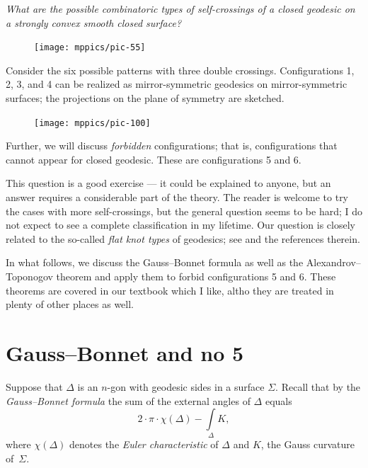 \documentclass[oneside,a4paper]{amsart}
\begin{document}
\medskip

\emph{What are the possible combinatoric types of self-crossings of a closed geodesic on a strongly convex smooth closed surface?}

\begin{figure}[ht!]
\begin{center}
\texttt{[image: mppics/pic-55]}
\end{center}
\end{figure}

Consider the six possible patterns with three double crossings.
Configurations 1, 2, 3, and 4 can be realized as mirror-symmetric geodesics on mirror-symmetric surfaces; the projections on the plane of symmetry are sketched.
\begin{figure}[ht!]
\begin{center}
\texttt{[image: mppics/pic-100]}
\end{center}
\end{figure}

Further, we will discuss \emph{forbidden} configurations;
that is, configurations that cannot appear for closed geodesic.
These are configurations 5 and 6.

This question is a good exercise --- it could be explained to anyone, but an answer requires a considerable part of the theory.
The reader is welcome to try the cases with more self-crossings, but the general question seems to be hard;
I do not expect to see a complete classification in my lifetime.
Our question is closely related to the so-called \emph{flat knot types} of geodesics;
see \cite{angenent} and the references therein.

In what follows, we discuss the Gauss--Bonnet formula as well as the Alexandrov--Toponogov theorem and apply them to forbid configurations 5 and 6.
These theorems are covered in our textbook \cite{petrunin-zamora} which I like, altho they are treated in plenty of other places as well.


\section*{Gauss--Bonnet and no 5}

Suppose that $\Delta$ is an $n$-gon with geodesic sides in a surface $\Sigma$.
Recall that by the \emph{Gauss--Bonnet formula} the sum of the external angles of $\Delta$ equals
\[2\cdot\pi\cdot\chi(\Delta)-\int\limits_\Delta K,\]
where $\chi(\Delta)$ denotes the \emph{Euler characteristic} of $\Delta$ and $K$, the Gauss curvature of~$\Sigma$.
\end{document}
